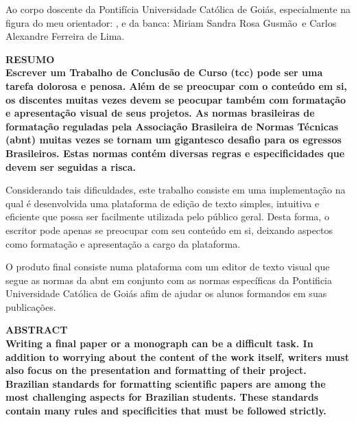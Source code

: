 \documentclass[12pt,a4paper,oneside,brazil]{abntex2}
\newcommand{\bancaUm}{Miriam Sandra Rosa Gusmão}
\newcommand{\bancaDois}{Carlos Alexandre Ferreira de Lima}
\begin{document}
Ao corpo doscente da Pontifícia Universidade Católica de Goiás,
especialmente na figura do meu orientador: \imprimirorientador, e da
banca: \bancaUm~e \bancaDois.
\clearpage


\centering
\ABNTEXchapterfont\bfseries{\textsc{\MakeUppercase{Resumo}}}\\
\vspace*{3cm}
\justifying
\normalfont
Escrever um Trabalho de Conclusão de Curso (\acrshort{tcc}) pode ser uma tarefa dolorosa e penosa.
Além de se preocupar com o conteúdo em si, os discentes muitas vezes devem se peocupar também com formatação e
apresentação visual de seus projetos. As normas brasileiras de formatação reguladas pela Associação Brasileira de Normas Técnicas
(\acrshort{abnt}) muitas vezes se tornam um gigantesco desafio para os egressos Brasileiros. Estas normas contém diversas regras
e especificidades que devem ser seguidas a risca.

Considerando tais dificuldades, este trabalho consiste em uma implementação na qual é desenvolvida uma plataforma de edição de texto
simples, intuitiva e eficiente que possa ser facilmente utilizada pelo público geral.
Desta forma, o escritor pode apenas se preocupar com seu conteúdo em si, deixando aspectos como formatação e apresentação
a cargo da plataforma.

O produto final consiste numa plataforma com um editor de texto visual que segue as normas da \acrshort{abnt} em conjunto com as
normas específicas da Pontificia Universidade Católica de Goiás afim de ajudar os alunos formandos em suas publicações.
\clearpage

\centering
\ABNTEXchapterfont\bfseries{\textsc{\MakeUppercase{Abstract}}}\\
\vspace*{3cm}
\justifying
\normalfont
Writing a final paper or a monograph can be a difficult task. In addition to worrying about the content of the work itself, writers must also focus on the presentation and formatting of their project. Brazilian standards for formatting scientific papers are among the most challenging aspects for Brazilian students. These standards contain many rules and specificities that must be followed strictly.
\end{document}
